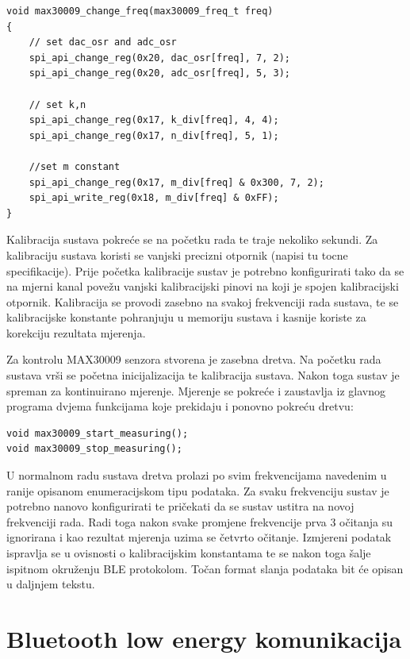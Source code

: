 \documentclass[../diplomski_rad.tex]{subfiles}
\begin{document}
\begin{lstlisting}[label={lst:promjena_frekvencije},style=CStyle,caption={Funkcija za promjenu frekvenciju sustava},captionpos=b]
void max30009_change_freq(max30009_freq_t freq)
{
    // set dac_osr and adc_osr
    spi_api_change_reg(0x20, dac_osr[freq], 7, 2);
    spi_api_change_reg(0x20, adc_osr[freq], 5, 3);

    // set k,n
    spi_api_change_reg(0x17, k_div[freq], 4, 4);
    spi_api_change_reg(0x17, n_div[freq], 5, 1);

    //set m constant
    spi_api_change_reg(0x17, m_div[freq] & 0x300, 7, 2);         
    spi_api_write_reg(0x18, m_div[freq] & 0xFF);
}
\end{lstlisting}

Kalibracija sustava pokreće se na početku rada te traje nekoliko sekundi.
Za kalibraciju sustava koristi se vanjski precizni otpornik (napisi tu tocne specifikacije). 
Prije početka kalibracije sustav je potrebno konfigurirati tako da se na mjerni kanal povežu 
vanjski kalibracijski pinovi na koji je spojen kalibracijski otpornik. 
Kalibracija se provodi zasebno na svakoj frekvenciji rada sustava, te se kalibracijske konstante pohranjuju 
u memoriju sustava i kasnije koriste za korekciju rezultata mjerenja. 

Za kontrolu MAX30009 senzora stvorena je zasebna dretva. Na početku rada sustava vrši se početna inicijalizacija te 
kalibracija sustava. Nakon toga sustav je spreman za kontinuirano mjerenje. Mjerenje se pokreće i zaustavlja iz 
glavnog programa dvjema funkcijama koje prekidaju i ponovno pokreću dretvu:
\begin{lstlisting}[label={lst:max30009_kontrola},style=CStyle,caption={Funkcije za početak i prekid mjerenja},captionpos=b]
void max30009_start_measuring();
void max30009_stop_measuring();
\end{lstlisting}
U normalnom radu sustava dretva prolazi po svim frekvencijama navedenim u ranije opisanom enumeracijskom tipu podataka. 
Za svaku frekvenciju sustav je potrebno nanovo konfigurirati te pričekati da se sustav ustitra na novoj frekvenciji rada. 
Radi toga nakon svake promjene frekvencije prva 3 očitanja su ignorirana i kao rezultat mjerenja uzima se četvrto očitanje. 
Izmjereni podatak ispravlja se u ovisnosti o kalibracijskim konstantama te se nakon toga šalje ispitnom okruženju BLE protokolom. 
Točan format slanja podataka bit će opisan u daljnjem tekstu.

\section{Bluetooth low energy komunikacija}
\end{document}
